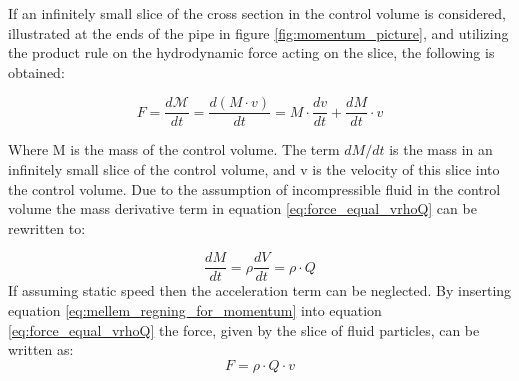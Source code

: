 If an infinitely small slice of the cross section in the control volume is considered, illustrated at the ends of the pipe in figure \ref{fig:momentum_picture}, and utilizing the product rule on the hydrodynamic force acting on the slice, the following is obtained:   

\begin{equation}\label{eq:force_equal_vrhoQ}
	F=\frac{d\mathcal{M}}{dt} = \frac{d(M\cdot v)}{dt} =M \cdot \frac{dv}{dt} + \frac{dM}{dt} \cdot v 
\end{equation}

Where M is the mass of the control volume. The term $dM/dt$ is the mass in an infinitely small slice of the control volume, and v is the velocity of this slice into the control volume. Due to the assumption of incompressible fluid in the control volume the mass derivative term in equation \ref{eq:force_equal_vrhoQ} can be rewritten to:



\begin{equation}\label{eq:mellem_regning_for_momentum}
	\frac{dM}{dt} = \rho \frac{dV}{dt} = \rho\cdot Q
\end{equation}
If assuming static speed then the acceleration term can be neglected. By inserting equation \ref{eq:mellem_regning_for_momentum} into equation \ref{eq:force_equal_vrhoQ} the force, given by the slice of fluid particles, can be written as:
\begin{equation}
	F = \rho\cdot Q\cdot v 
\end{equation}

